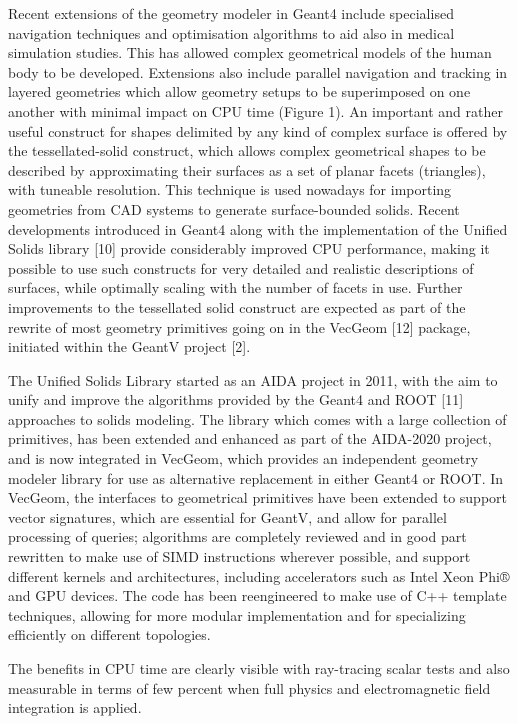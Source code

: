 \documentclass[12pt,a4paper]{article}
\begin{document}
Recent extensions of the geometry modeler in Geant4 include specialised
navigation techniques and optimisation algorithms to aid also in medical
simulation studies. This has allowed complex geometrical models of the
human body to be developed. Extensions also include parallel navigation
and tracking in layered geometries which allow geometry setups to be
superimposed on one another with minimal impact on CPU time (Figure 1).
An important and rather useful construct for shapes delimited by any
kind of complex surface is offered by the tessellated-solid construct,
which allows complex geometrical shapes to be described by approximating
their surfaces as a set of planar facets (triangles), with tuneable
resolution. This technique is used nowadays for importing geometries
from CAD systems to generate surface-bounded solids. Recent developments
introduced in Geant4 along with the implementation of the Unified Solids
library {[}10{]} provide considerably improved CPU performance, making
it possible to use such constructs for very detailed and realistic
descriptions of surfaces, while optimally scaling with the number of
facets in use. Further improvements to the tessellated solid construct
are expected as part of the rewrite of most geometry primitives going on
in the VecGeom {[}12{]} package, initiated within the GeantV project
{[}2{]}.

The Unified Solids Library started as an AIDA project in 2011, with the
aim to unify and improve the algorithms provided by the Geant4 and ROOT
{[}11{]} approaches to solids modeling. The library which comes with a
large collection of primitives, has been extended and enhanced as part
of the AIDA-2020 project, and is now integrated in VecGeom, which
provides an independent geometry modeler library for use as alternative
replacement in either Geant4 or ROOT. In VecGeom, the interfaces to
geometrical primitives have been extended to support vector signatures,
which are essential for GeantV, and allow for parallel processing of
queries; algorithms are completely reviewed and in good part rewritten
to make use of SIMD instructions wherever possible, and support
different kernels and architectures, including accelerators such as
Intel Xeon Phi® and GPU devices. The code has been reengineered to make
use of C++ template techniques, allowing for more modular implementation
and for specializing efficiently on different topologies.

The benefits in CPU time are clearly visible with ray-tracing scalar
tests and also measurable in terms of few percent when full physics and
electromagnetic field integration is applied.
\end{document}
